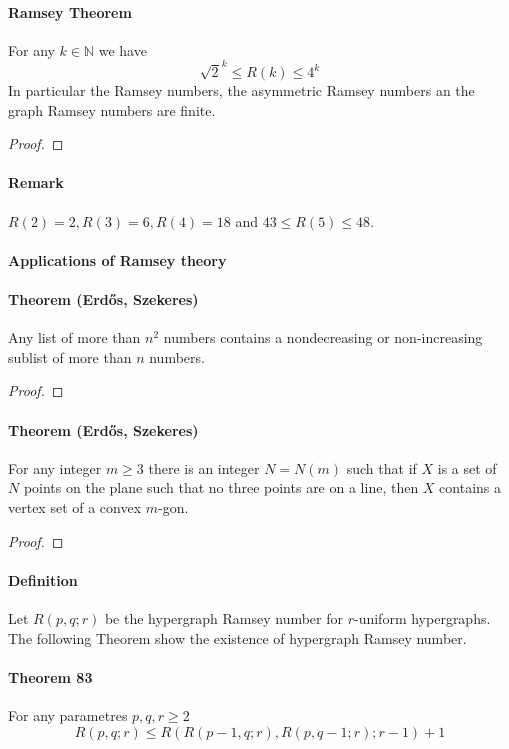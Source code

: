 \paragraph{Ramsey Theorem} For any $k \in \mathbb{N}$ we have 
$$ \sqrt{2}^k \leq R(k) \leq 4^k $$ 
In particular the Ramsey numbers, the asymmetric Ramsey numbers an the graph 
Ramsey numbers are finite.
\begin{proof}
    {\color{red}{TODO}}
\end{proof}

\paragraph{Remark}
$R(2) = 2, R(3) = 6, R(4) = 18$ and $43 \leq R(5) \leq 48$.

\paragraph{Applications of Ramsey theory}

\paragraph{Theorem (Erd\H{o}s, Szekeres)} Any list of more than $n^2$ numbers 
contains a nondecreasing or non-increasing sublist of more than $n$ numbers.
\begin{proof}
    {\color{red}{TODO}}
\end{proof}

\paragraph{Theorem (Erd\H{o}s, Szekeres)} For any integer $m \geq 3$ there is 
an integer $N = N(m)$ such that if $X$ is a set of $N$ points on the plane 
such that no three points are on a line, then $X$ contains a vertex set of a convex 
$m$-gon.
\begin{proof}
    {\color{red}{TODO}}
\end{proof}

\paragraph{Definition}
Let $R(p,q;r)$ be the hypergraph Ramsey number for $r$-uniform hypergraphs.
The following Theorem show the existence of hypergraph Ramsey number.

\paragraph{Theorem 83} For any parametres $p,q,r \geq 2$
$$ R(p,q;r) \leq R(R(p-1,q;r), R(p,q-1;r);r-1) + 1 $$ 